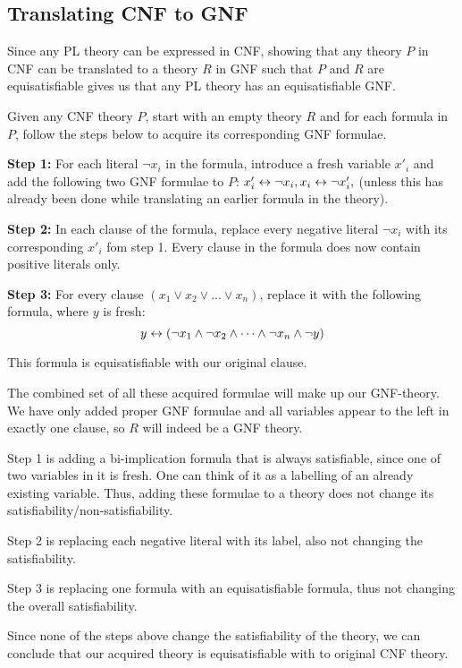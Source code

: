 \subsection{Translating CNF to GNF}
\label{sub:Translating CNF to GNF}
Since any PL theory can be expressed in CNF, showing that any theory $P$ in CNF can be translated to a theory $R$ in GNF such that $P$ and $R$ are equisatisfiable gives us that any PL theory has an equisatisfiable GNF.

Given any CNF theory $P$, start with an empty theory $R$ and for each formula in $P$, follow the steps below to acquire its corresponding GNF formulae.

\textbf{Step 1:}
For each literal $\neg x_i$ in the formula, introduce a fresh variable $x'_i$ and add the following two GNF formulae to $P$:
$x'_i \leftrightarrow \neg x_i, x_i \leftrightarrow \neg x'_i,$ (unless this has already been done while translating an earlier formula in the theory).

\textbf{Step 2:}
In each clause of the formula, replace every negative literal $\neg x_i$ with its corresponding $x'_i$ fom step 1.
Every clause in the formula does now contain positive literals only.

\textbf{Step 3:}
For every clause $(x_1 \vee x_2 \vee \dots \vee x_n)$, replace it with the following formula, where $y$ is fresh:
\[y \leftrightarrow (\neg x_1 \wedge \neg x_2 \wedge \dots \wedge \neg x_n \wedge \neg y)\]

This formula is equisatisfiable with our original clause.

The combined set of all these acquired formulae will make up our GNF-theory.
We have only added proper GNF formulae and all variables appear to the left in exactly one clause, so $R$ will indeed be a GNF theory.

Step 1 is adding a bi-implication formula that is always satisfiable, since one of two variables in it is fresh.
One can think of it as a labelling of an already existing variable.
Thus, adding these formulae to a theory does not change its satisfiability/non-satisfiability.

Step 2 is replacing each negative literal with its label, also not changing the satisfiability.

Step 3 is replacing one formula with an equisatisfiable formula, thus not changing the overall satisfiability.

Since none of the steps above change the satisfiability of the theory, we can conclude that our acquired theory is equisatisfiable with to original CNF theory.


